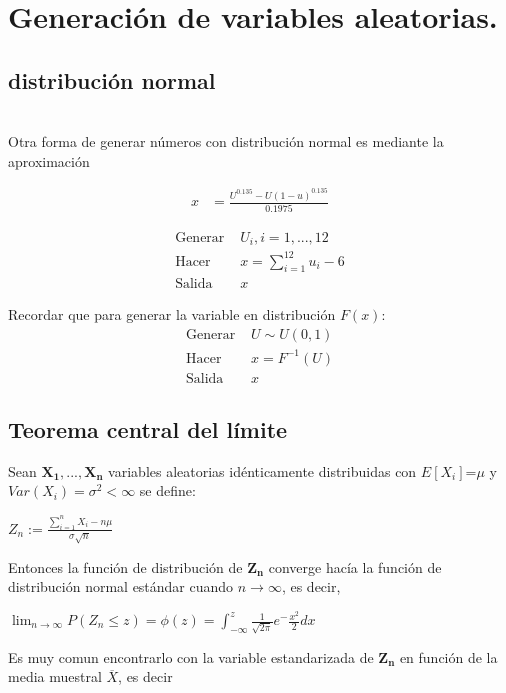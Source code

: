 \documentclass[es-lat]{article}
\begin{document}
\section{Generación de variables aleatorias.}
\subsection{distribución normal}
\\Otra forma de generar números con distribución normal es mediante la aproximación

\begin{align*} 
x&= \tfrac{U^{0.135}-U(1-u)^{0.135}}{0.1975}
\end{align*}

\begin{align*} 
\text{Generar } & U_{i},  i=1,...,12\\ 
\text{Hacer } &  x=\sum_{i=1}^{12}u_{i}-6\\ 
\text{Salida } & x
\end{align*}

Recordar que para generar la variable en distribución $F(x):$
\begin{align*} 
\text{Generar }  &U\sim U(0,1)\\ 
\text{Hacer } &  x=F^{-1}(U)\\ 
\text{Salida } & x
\end{align*}

\subsection{Teorema central del límite}
Sean $\mathbf{X_{1},...,X_{n}}$ variables aleatorias idénticamente distribuidas con $E[X_{i}]$=$\mu$ y $Var(X_{i})=\sigma^2< \infty $ se define:

\begin{center}
$Z_{n}:= \frac{\sum_{i=1}^{n}X_{i}-n\mu}{\sigma\sqrt{n}}$

\end{center}

Entonces la función de distribución de $\mathbf{Z_{n}}$ converge hacía la función de distribución normal estándar cuando $n \to \infty $, es decir,

\begin{center}
    $\lim_{n\to\infty}P(Z_{n}\leq z)=\phi (z)=\int_{-\infty}^{z}\frac{1}{\sqrt{2\pi}}e^-{\frac{x^{2}}{2}}dx$
\end{center}

Es muy comun encontrarlo con la variable estandarizada de $\mathbf{Z_{n}}$ en función de la media muestral $\overline{X}$, es decir
\end{document}
